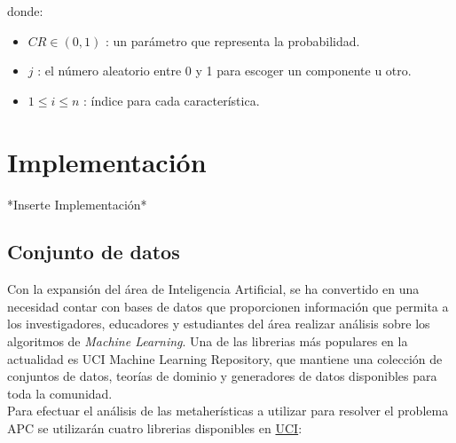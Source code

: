 \documentclass{ci5652}
\begin{document}
donde: 
\begin{itemize}
  \item $CR \in (0,1)$ : un parámetro que representa la probabilidad.
  \item $j$ : el número aleatorio entre 0 y 1 para escoger un componente u otro.
  \item $1 \leq i \leq n $ : índice para cada característica.
\end{itemize}



\section{Implementación}
*Inserte Implementación*


\subsection{Conjunto de datos}

Con la expansión del área de Inteligencia Artificial, se ha convertido en una
necesidad contar con bases de datos que proporcionen información que permita a
los investigadores, educadores y estudiantes del área realizar análisis sobre 
los algoritmos de \textit{Machine Learning}. Una de las librerias más populares
en la actualidad es UCI Machine Learning Repository, que mantiene una colección
de conjuntos de datos, teorías de dominio y generadores de datos disponibles 
para toda la comunidad.\\

Para efectuar el análisis de las metaherísticas a utilizar para resolver el
problema APC se utilizarán cuatro librerias disponibles en 
\href{http://archive.ics.uci.edu/ml/index.php}{UCI}:
\end{document}
